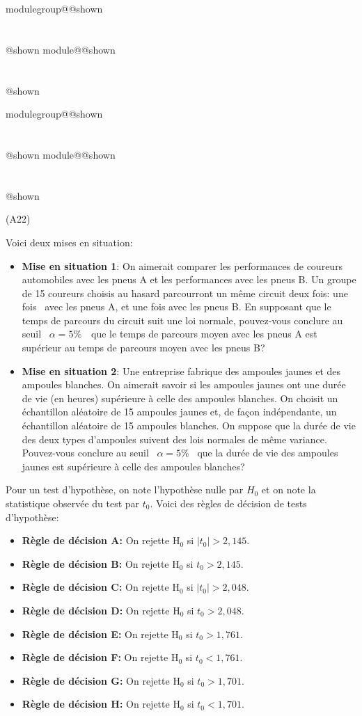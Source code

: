 \documentclass{Evaluation}
\makeatletter
\newcommand{\currentmodulekey}{}
\newcommand{\currentmoduletitle}{}
\newcommand{\currentgroupkey}{}
\newcommand{\currentgrouptitle}{}
\newcommand{\showmoduleifneeded}{%
  \ifx\currentgroupkey\empty\else
    \expandafter\ifx\csname modulegroup@\currentgroupkey @shown\endcsname\relax
      \section*{\currentgrouptitle}%
      \expandafter\gdef\csname modulegroup@\currentgroupkey @shown\endcsname{1}%
    \fi
  \fi
  \expandafter\ifx\csname module@\currentmodulekey @shown\endcsname\relax
    \section*{\currentmoduletitle}%
    \expandafter\gdef\csname module@\currentmodulekey @shown\endcsname{1}%
  \fi
}
\newenvironment{A22}{\showmoduleifneeded}{}
\makeatother
\begin{document}
\begin{questions}
\begin{A22}
\end{A22}

\begin{A22}
\question
(A22)

Voici deux mises en situation:
\begin{itemize}
    \item {\bf Mise en situation 1}: On aimerait comparer les performances de coureurs automobiles avec les pneus A et les performances avec les pneus B. Un groupe de 15 coureurs choisis au hasard parcourront un même circuit deux fois: une fois  avec les pneus A, et une fois avec les pneus B. En supposant que le temps de parcours du circuit suit une loi normale, pouvez-vous conclure au seuil  $\alpha=5\%$  que le temps de parcours moyen avec les pneus A est supérieur au temps de parcours moyen avec les pneus B?
    \item {\bf Mise en situation 2}: Une entreprise fabrique des ampoules jaunes et des ampoules blanches. On aimerait savoir si les ampoules jaunes ont une durée de vie (en heures) supérieure à celle des ampoules blanches. On choisit un échantillon aléatoire de 15 ampoules jaunes et, de façon indépendante, un échantillon aléatoire de 15 ampoules blanches. On suppose que la durée de vie des deux types d'ampoules suivent des lois normales de même variance. Pouvez-vous conclure au seuil  $\alpha=5\%$  que la durée de vie des ampoules jaunes est supérieure à celle des ampoules blanches?
\end{itemize}

\medskip

Pour un test d'hypothèse, on note l'hypothèse nulle par $H_0$ et on note la statistique observée du test par $t_0$. Voici des règles de décision de tests d'hypothèse:

\begin{itemize}
    \item {\bf Règle de décision A:}  On rejette $\mathrm{H}_0$ si $|t_0| > 2,145$.  
    \item {\bf Règle de décision B:} On rejette $\mathrm{H}_0$ si $t_0 > 2,145$. 
    \item {\bf Règle de décision C:}  On rejette $\mathrm{H}_0$ si $|t_0| >2,048$. 
    \item {\bf Règle de décision D:}  On rejette $\mathrm{H}_0$ si $t_0 >2,048$. 
    \item {\bf Règle de décision E:} On rejette $\mathrm{H}_0$ si $t_0 > 1,761$. 
    \item {\bf Règle de décision F:} On rejette $\mathrm{H}_0$ si $t_0 < 1,761$.  
    \item {\bf Règle de décision G:}  On rejette $\mathrm{H}_0$ si $t_0 > 1,701$. 
    \item {\bf Règle de décision H:}  On rejette $\mathrm{H}_0$ si $t_0 < 1,701$. 
\end{itemize}


\end{A22}
\end{questions}
\end{document}
